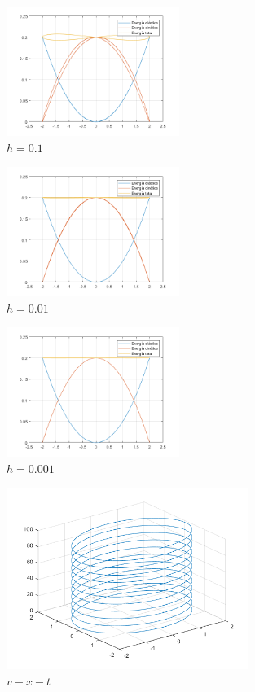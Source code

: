 \documentclass{article}
\begin{document}
\newpage
\clearpage

\begin{figure}[H]
\centering
    \includegraphics[width=0.5\textwidth]{images/001B.png}
    \caption{$h=0.1$}
\end{figure}

\begin{figure}[H]
\centering
    \includegraphics[width=0.5\textwidth]{images/001B2.png}
    \caption{$h=0.01$}
\end{figure}

\begin{figure}[H]
\centering
    \includegraphics[width=0.5\textwidth]{images/001B3.png}
    \caption{$h=0.001$}
\end{figure}

\clearpage
\newpage

\begin{figure}[H]
\centering
    \includegraphics[width=0.7\textwidth]{images/001C.png}
    \caption{$v-x-t$}
\end{figure}
\end{document}
